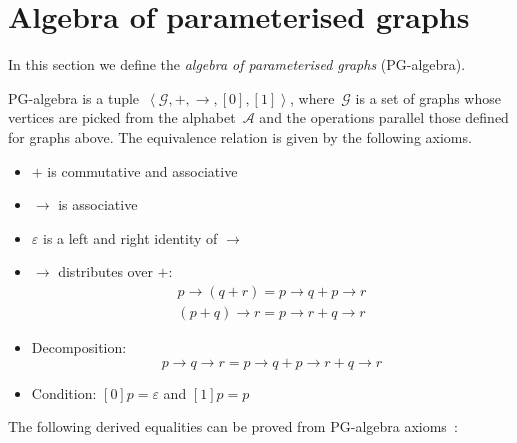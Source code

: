 \section{Algebra of parameterised graphs\label{sec:Algebra-of-parametrised}}

In this section we define the \emph{algebra of parameterised graphs}
(PG-algebra).

PG-algebra is a tuple~$\left\langle \mathcal{G},+,\rightarrow,[0],[1]\right\rangle $,
where~$\mathcal{G}$ is a set of graphs whose vertices are picked
from the alphabet~$\mathcal{A}$ and the operations parallel those
defined for graphs above. The equivalence relation is given by the
following axioms.
\begin{itemize}
\item $+$ is commutative and associative
\item $\rightarrow$ is associative
\item $\varepsilon$ is a left and right identity of $\rightarrow$
\item $\rightarrow$ distributes over $+$:\vspace{-0.3em}
\[
\begin{array}{c}
p\rightarrow(q+r)=p\rightarrow q+p\rightarrow r\\
(p+q)\rightarrow r=p\rightarrow r+q\rightarrow r
\end{array}
\]

\item Decomposition: \vspace{-0.3em}
\[
p\rightarrow q\rightarrow r=p\rightarrow q+p\rightarrow r+q\rightarrow r
\]

\item Condition: $[0]p=\varepsilon$ and $[1]p=p$
\end{itemize}
The following derived equalities can be proved from PG-algebra axioms~\cite[Prop. 2, 3]{2011_mokhov_pg}:

